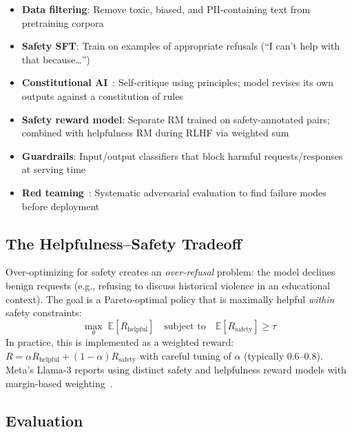 \begin{keybox}
\begin{itemize}
  \item \textbf{Data filtering}: Remove toxic, biased, and PII-containing text from pretraining corpora
  \item \textbf{Safety SFT}: Train on examples of appropriate refusals (``I can’t help with that because\ldots{}'')
  \item \textbf{Constitutional AI}~\cite{bai2022constitutional}: Self-critique using principles; model revises its own outputs against a constitution of rules
  \item \textbf{Safety reward model}: Separate RM trained on safety-annotated pairs; combined with helpfulness RM during RLHF via weighted sum
  \item \textbf{Guardrails}: Input/output classifiers that block harmful requests/responses at serving time
  \item \textbf{Red teaming}~\cite{perez2022red}: Systematic adversarial evaluation to find failure modes before deployment
\end{itemize}
\end{keybox}

\subsection{The Helpfulness--Safety Tradeoff}
\label{the-helpfulnesssafety-tradeoff}

\begin{intuitionbox}
Over-optimizing for safety creates an \emph{over-refusal} problem: the model declines benign requests (e.g., refusing to discuss historical violence in an educational context). The goal is a Pareto-optimal policy that is maximally helpful \emph{within} safety constraints: 
\[
\max_\theta \; \mathbb{E}[R_\text{helpful}] \quad \text{subject to} \quad \mathbb{E}[R_\text{safety}] \geq \tau
\]
 In practice, this is implemented as a weighted reward: $R = \alpha R_\text{helpful} + (1-\alpha) R_\text{safety}$ with careful tuning of $\alpha$ (typically 0.6--0.8). Meta’s Llama-3 reports using distinct safety and helpfulness reward models with margin-based weighting~\cite{grattafiori2024llama3}.
\end{intuitionbox}

\subsection{Evaluation}
\label{evaluation}

